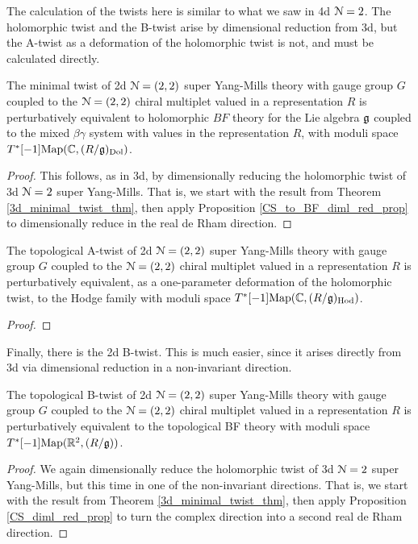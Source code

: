 \documentclass[10pt, oneside]{article}
\begin{document}
The calculation of the twists here is similar to what we saw in 4d $\mathcal{N}=2$.  The holomorphic twist and the B-twist arise by dimensional reduction from 3d, but the A-twist as a deformation of the holomorphic twist is not, and must be calculated directly.

\begin{theorem} \label{2d_minimal_twist_thm}
The minimal twist of 2d $\mathcal N=(2,2)$ super Yang-Mills theory with gauge group $G$ coupled to the $\mathcal N=(2,2)$ chiral multiplet valued in a representation $R$ is perturbatively equivalent to holomorphic $BF$ theory for the Lie algebra $\mathfrak g$ coupled to the mixed $\beta\gamma$ system with values in the representation $R$, with moduli space $T^*[-1]\mathrm{Map}(\mathbb C, (R/\mathfrak{g})_{\mathrm{Dol}})$. 
\end{theorem}

\begin{proof}
This follows, as in 3d, by dimensionally reducing the holomorphic twist of 3d $\mathcal{N}=2$ super Yang-Mills.  That is, we start with the result from Theorem \ref{3d_minimal_twist_thm}, then apply Proposition \ref{CS_to_BF_diml_red_prop} to dimensionally reduce in the real de Rham direction.
\end{proof}

\begin{theorem} \label{2d_2_A_twist_thm}
The topological A-twist of 2d $\mathcal{N}=(2,2)$ super Yang-Mills theory with gauge group $G$ coupled to the $\mathcal{N}=(2,2)$ chiral multiplet valued in a representation $R$ is perturbatively equivalent, as a one-parameter deformation of the holomorphic twist, to the Hodge family with moduli space $T^*[-1]\mathrm{Map}(\mathbb C, (R/\mathfrak{g})_{\mathrm{Hod}})$.
\end{theorem}

\begin{proof}
 
\end{proof}

Finally, there is the 2d B-twist.  This is much easier, since it arises directly from 3d via dimensional reduction in a non-invariant direction.
\begin{theorem} \label{2d_2_B_twist_thm}
The topological B-twist of 2d $\mathcal{N}=(2,2)$ super Yang-Mills theory with gauge group $G$ coupled to the $\mathcal{N}=(2,2)$ chiral multiplet valued in a representation $R$ is perturbatively equivalent to the topological BF theory with moduli space $T^*[-1]\mathrm{Map}(\mathbb R^2, (R/\mathfrak{g}))$.
\end{theorem}

\begin{proof}
We again dimensionally reduce the holomorphic twist of 3d $\mathcal{N}=2$ super Yang-Mills, but this time in one of the non-invariant directions.  That is, we start with the result from Theorem \ref{3d_minimal_twist_thm}, then apply Proposition \ref{CS_diml_red_prop} to turn the complex direction into a second real de Rham direction.
\end{proof}
\end{document}
